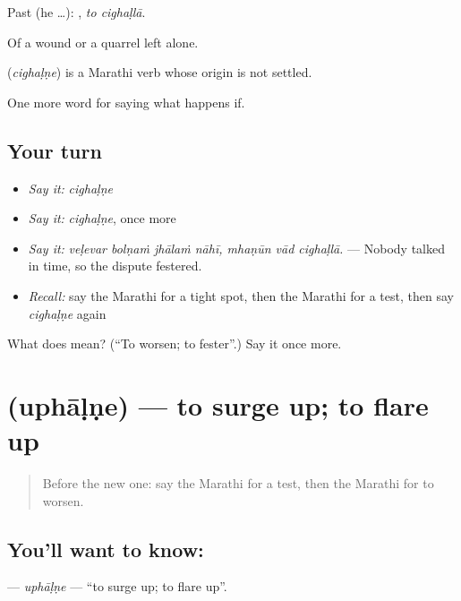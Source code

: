 Past (he …):  , \emph{to cighaḷlā}.

Of a wound or a quarrel left alone.

\begin{cousinweb}
\textbf{} (\emph{cighaḷṇe}) is a Marathi verb whose origin is not settled.
\end{cousinweb}

\begin{grammarlens}[title={What you've built}]
One more word for saying what happens if.
\end{grammarlens}

\subsection*{Your turn}
\begin{itemize}
\raggedright
  \item \emph{Say it:} \emph{cighaḷṇe}
  \item \emph{Say it:} \emph{cighaḷṇe}, once more
  \item \emph{Say it:} \emph{veḷevar bolṇaṁ jhālaṁ nāhī, mhaṇūn vād cighaḷlā.} — Nobody talked in time, so the dispute festered.
  \item \emph{Recall:} say the Marathi for a tight spot, then the Marathi for a test, then say \emph{cighaḷṇe} again
\end{itemize}

\begin{tcolorbox}[breakable,colback=teal!4,colframe=teal!35!black,title={Before you move on}]
What does  mean? (\textquotedblleft{}To worsen; to fester\textquotedblright{}.) Say it once more.
\end{tcolorbox}
\section[\texorpdfstring{\mr{उफाळणे} (uphāḷṇe)}{उफाळणे (uphāḷṇe)}]{ (uphāḷṇe) — to surge up; to flare up}

\label{lesson:MR-C385-uphalne}



\begin{quote}
Before the new one: say the Marathi for a test, then the Marathi for to worsen.
\end{quote}

\subsection*{You'll want to know: }
\textbf{} — \emph{uphāḷṇe} — \textquotedblleft{}to surge up; to flare up\textquotedblright{}.

